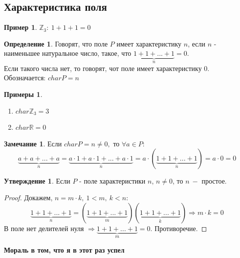 \documentclass[a4paper, 12pt]{article}
\newcommand{\R}{\mathbb R}
\newcommand{\Z}{\mathbb Z}
\newcommand\tab[1][.5cm]{\hspace*{#1}}
\theoremstyle{definition}
\newtheorem*{definition}{Определение}
\newtheorem*{subtheorem}{Утверждение}
\newtheorem*{remark}{Замечание}
\newtheorem*{example}{Примеры}
\newtheorem*{example1}{Пример}
\begin{document}
  \subsection{Характеристика поля}
  \begin{example1}
    $\Z_3: \ 1 + 1 + 1 = 0$ 
  \end{example1}
  \begin{definition}
    Говорят, что поле $P$ имеет характеристику $n$, если $n$ - наименьшее натуральное число, такое, что $\underbrace{1 + 1 + ... + 1}_{n} = 0 $. \\
    Если такого числа нет, то говорят, чот поле имеет характеристику 0.\\
    Обозначается: $charP=n$ 
  \end{definition} 
  \begin{example} \tab
    \begin{enumerate}
      \item $char\Z_3 = 3$
      \item $char\R = 0$  
    \end{enumerate}
  \end{example}
  \begin{remark}
    Если $charP = n \neq 0, $ то $\forall a \in P:$ 
    $$ \underbrace{a+a+...+a}_{n} = \underbrace{a\cdot 1+a\cdot 1+...+a\cdot 1}_{n} = a\cdot (\underbrace{1+1+...+1}_{n}) = a \cdot 0 =0 $$ 
  \end{remark} 
  \begin{subtheorem}
    Если $P$ - поле характеристики $n$, $n \neq 0$, то $n \ -$ простое. 
  \end{subtheorem} 
  \begin{proof}
    Докажем, $n=m\cdot k, \ 1<m, \ k<n$:
    $$\underbrace{1+1+...+1}_{n} = (\underbrace{1+1+...+1}_{m})(\underbrace{1+1+...+1}_{k})\Longrightarrow m \cdot k=0$$  
    В поле нет делителей нуля $\Longrightarrow \underbrace{1+1+...+1}_{m} = 0$. Противоречие.
  \end{proof} 







  \textbf{Мораль в том, что я в этот раз успел} 
  
\end{document}
